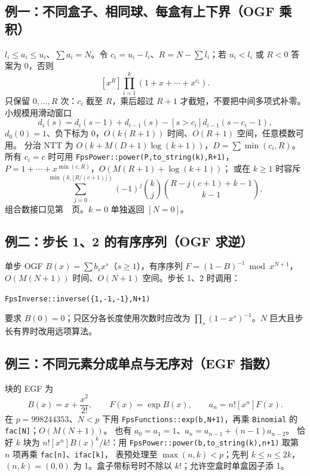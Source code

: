 \subsection{例一：不同盒子、相同球、每盒有上下界（OGF 乘积）}
$l_i\le a_i\le u_i$、$\sum a_i=N$。令 $c_i=u_i-l_i$、$R=N-\sum l_i$；若 $u_i<l_i$ 或 $R<0$ 答案为 0，否则
\[
[x^R]\prod_{i=1}^k(1+x+\cdots+x^{c_i}).
\]
只保留 $0,\ldots,R$ 次：$c_i$ 截至 $R$，乘后超过 $R+1$ 才截短，不要把中间多项式补零。
小规模用滑动窗口
\[
d_i(s)=d_i(s-1)+d_{i-1}(s)-[s>c_i]d_{i-1}(s-c_i-1),
\]
$d_0(0)=1$、负下标为 0，$O(k(R+1))$ 时间、$O(R+1)$ 空间，任意模数可用。
分治 NTT 为 $O(k+M(D+1)\log(k+1))$，$D=\sum\min(c_i,R)$。
所有 $c_i=c$ 时可用 \texttt{FpsPower::power(P,to\_string(k),R+1)}，$P=1+\cdots+x^{\min(c,R)}$，$O(M(R+1)+\log(k+1))$；
或在 $k\ge1$ 时容斥
\[
\sum_{j=0}^{\min(k,\lfloor R/(c+1)\rfloor)}
(-1)^j\binom kj\binom{R-j(c+1)+k-1}{k-1},
\]
组合数接口见第~\pageref{knowledge-binomial-choice}~页。$k=0$ 单独返回 $[N=0]$。

\subsection{例二：步长 1、2 的有序序列（OGF 求逆）}
单步 OGF $B(x)=\sum b_sx^s$（$s\ge1$），有序序列 $F=(1-B)^{-1}\bmod x^{N+1}$，$O(M(N+1))$ 时间、$O(N+1)$ 空间。步长 1、2 时调用：

\noindent\texttt{FpsInverse::inverse(\{1,-1,-1\},N+1)}


要求 $B(0)=0$；只区分各长度使用次数时应改为 $\prod_s(1-x^s)^{-1}$。$N$ 巨大且步长有界时改用远项算法。

\subsection{例三：不同元素分成单点与无序对（EGF 指数）}
块的 EGF 为
\[
B(x)=x+\frac{x^2}{2!},\qquad
F(x)=\exp B(x),\qquad a_n=n![x^n]F(x).
\]
在 $p=998244353$、$N<p$ 下用 \texttt{FpsFunctions::exp(b,N+1)}，再乘 \texttt{Binomial} 的 \texttt{fac[N]}；$O(M(N+1))$。
也有 $a_0=a_1=1$、$a_n=a_{n-1}+(n-1)a_{n-2}$。
恰好 $k$ 块为 $n![x^n]B(x)^k/k!$：用 \texttt{FpsPower::power(b,to\_string(k),n+1)} 取第 $n$ 项再乘 \texttt{fac[n]}、\texttt{ifac[k]}，
表预处理至 $\max(n,k)<p$；先判 $k\le n\le2k$，$(n,k)=(0,0)$ 为 1。盒子带标号时不除以 $k!$；允许空盒时单盒因子添 1。

\label{end-combinatorics-supplement}

